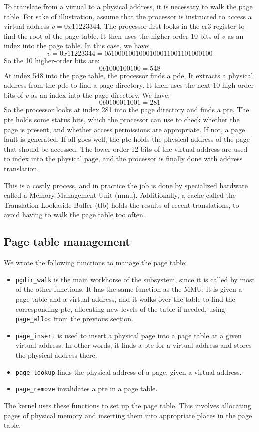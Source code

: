 \documentclass{article}
\begin{document}
To translate from a virtual to a physical address, it is necessary to walk the
page table. For sake of illustration, assume that the processor is instructed
to access a virtual address $v = 0x11223344$. The processor first looks in the
\gls{cr3} register to find the root of the page table. It then uses the
higher-order 10 bits of $v$ as an index into the page table. In this case, we
have:
$$ v = 0x11223344 = 0b10001001000100011001101000100 $$
So the 10 higher-order bits are:
$$ 0b1000100100 = 548 $$
At index 548 into the page table, the processor finds a \gls{pde}. It extracts
a physical address from the \gls{pde} to find a page directory. It then uses
the next 10 high-order bits of $v$ as an index into the page directory. We
have:
$$ 0b0100011001 = 281 $$
So the processor looks at index 281 into the page directory and finds a
\gls{pte}. The \gls{pte} holds some status bits, which the processor can use
to check whether the page is present, and whether access permissions are
appropriate. If not, a page fault is generated. If all goes well, the
\gls{pte} holds the physical address of the page that should be accessed. The
lower-order 12 bits of the virtual address are used to index into the physical
page, and the processor is finally done with address translation.

This is a costly process, and in practice the job is done by specialized
hardware called a Memory Management Unit (\gls{mmu}). Additionally, a cache
called the Translation Lookaside Buffer (\gls{tlb}) holds the results of
recent translations, to avoid having to walk the page table too often.


\subsection{Page table management}
\label{sec:pagetables}
We wrote the following functions to manage the page table:
\begin{itemize}
\item \texttt{pgdir\_walk} is the main workhorse of the subsystem, since it is
called by most of the other functions. It has the same function as the MMU; it
is given a page table and a virtual address, and it walks over the table to
find the corresponding \gls{pte}, allocating new levels of the table if needed,
using \texttt{page\_alloc} from the previous section.
\item \texttt{page\_insert} is used to insert a physical page into a page
table at a given virtual address. In other words, it finds a \gls{pte} for a virtual
address and stores the physical address there.
\item \texttt{page\_lookup} finds the physical address of a page, given a
virtual address.
\item \texttt{page\_remove} invalidates a \gls{pte} in a page table.
\end{itemize}
The kernel uses these functions to set up the page table. This involves
allocating pages of physical memory and inserting them into appropriate places
in the page table. 
\end{document}
